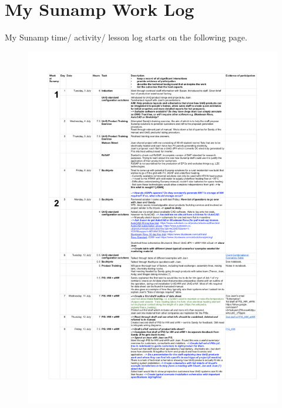 
\chapter{My Sunamp Work Log} %

\label{App:Log} %



My Sunamp time/ activity/ lesson log starts on the following page.

\begin{figure}
	\centering
	\includegraphics[height=\textheight]{Appendices/Log_01.png}
\end{figure}


